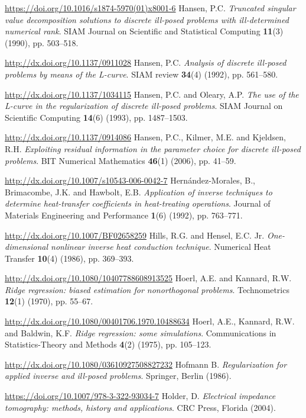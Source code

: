 \begin{thebibliography}{301}
\url{https://doi.org/10.1016/s1874-5970(01)x8001-6}
%
%
 Hansen, P.C. {\it Truncated singular value decomposition solutions to discrete ill-posed problems with ill-determined numerical rank}. SIAM Journal on Scientific and Statistical Computing {\bf 11}(3) (1990), pp. 503--518.

\url{http://dx.doi.org/10.1137/0911028}
%
%
 Hansen, P.C. {\it Analysis of discrete ill-posed problems by means of the L-curve}. SIAM review {\bf 34}(4) (1992), pp. 561--580.

\url{http://dx.doi.org/10.1137/1034115}
%
%
 Hansen, P.C. and Oleary, A.P. {\it The use of the L-curve in the regularization of discrete ill-posed problems}. SIAM Journal on Scientific Computing {\bf 14}(6) (1993), pp. 1487--1503.

\url{http://dx.doi.org/10.1137/0914086}
%
%
 Hansen, P.C., Kilmer, M.E. and Kjeldsen, R.H. {\it Exploiting residual information in the parameter choice for discrete ill-posed problems}. BIT Numerical Mathematics {\bf 46}(1) (2006), pp. 41--59.

\url{http://dx.doi.org/10.1007/s10543-006-0042-7}
%
%
 Hern\'andez-Morales, B., Brimacombe, J.K. and Hawbolt, E.B. {\it Application of inverse techniques to determine heat-transfer coefficients in heat-treating operations}. Journal of Materials Engineering and Performance {\bf 1}(6) (1992), pp. 763--771.

\url{http://dx.doi.org/10.1007/BF02658259}
%
%
 Hills, R.G. and Hensel, E.C. Jr. {\it One-dimensional nonlinear inverse heat conduction technique}. Numerical Heat Transfer {\bf 10}(4) (1986), pp. 369--393.

\url{http://dx.doi.org/10.1080/10407788608913525}
%
%
 Hoerl, A.E. and Kannard, R.W. {\it Ridge regression: biased estimation for nonorthogonal problems}. Technometrics {\bf 12}(1) (1970), pp. 55--67.

\url{http://dx.doi.org/10.1080/00401706.1970.10488634}
%
%
 Hoerl, A.E., Kannard, R.W. and Baldwin, K.F. {\it Ridge regression: some simulations}. Communications in Statistics-Theory and Methods {\bf 4}(2) (1975), pp. 105--123.

\url{http://dx.doi.org/10.1080/03610927508827232}
%
%
 Hofmann B. {\it Regularization for applied inverse and ill-posed problems}. Springer, Berlin (1986).

\url{https://doi.org/10.1007/978-3-322-93034-7}
%
%
 Holder, D. {\it Electrical impedance tomography: methods, history and applications}. CRC Press, Florida (2004).


\end{thebibliography}
